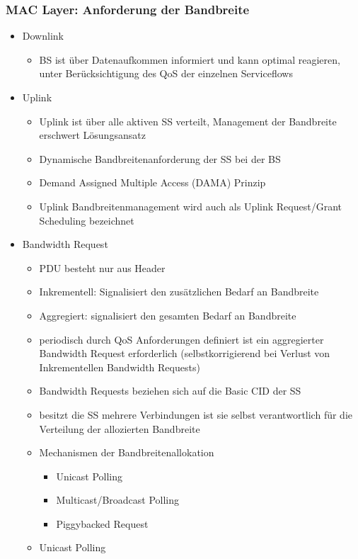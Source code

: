\subsubsection{MAC Layer: Anforderung der Bandbreite}
\begin{itemize}
\item Downlink
\begin{itemize}
\item BS ist über Datenaufkommen informiert und kann optimal reagieren, unter Berücksichtigung des QoS der einzelnen Serviceflows
\end{itemize}
\item Uplink
\begin{itemize}
\item Uplink ist über alle aktiven SS verteilt, Management der Bandbreite erschwert Lösungsansatz
\item Dynamische Bandbreitenanforderung der SS bei der BS
\item Demand Assigned Multiple Access (DAMA) Prinzip
\item Uplink Bandbreitenmanagement wird auch als Uplink Request/Grant Scheduling bezeichnet
\end{itemize}
\item Bandwidth Request
\begin{itemize}
\item PDU besteht nur aus Header
\item Inkrementell: Signalisiert den zusätzlichen Bedarf an Bandbreite
\item Aggregiert: signalisiert den gesamten Bedarf an Bandbreite
\item periodisch durch QoS Anforderungen definiert ist ein aggregierter Bandwidth Request erforderlich (selbstkorrigierend bei Verlust von Inkrementellen Bandwidth Requests)
\item Bandwidth Requests beziehen sich auf die Basic CID der SS
\item besitzt die SS mehrere Verbindungen ist sie selbst verantwortlich für die Verteilung der allozierten Bandbreite
\item Mechanismen der Bandbreitenallokation
\begin{itemize}
\item Unicast Polling
\item Multicast/Broadcast Polling
\item Piggybacked Request
\end{itemize}
\item Unicast Polling
\begin{itemize}

\end{itemize}
\end{itemize}
\end{itemize}
